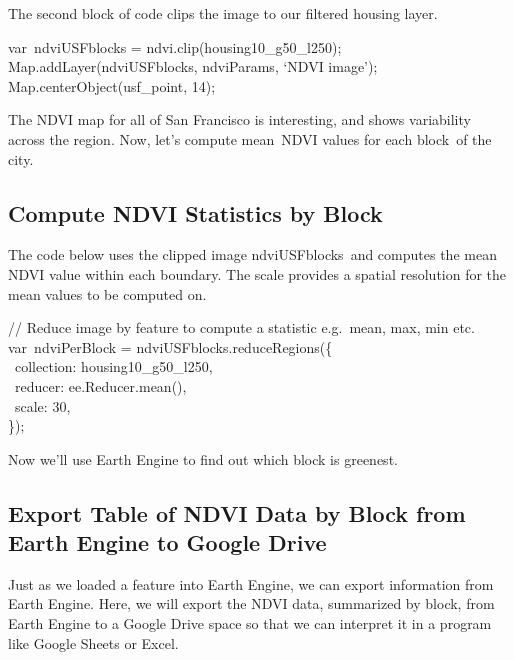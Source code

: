 \documentclass[
  letterpaper,
  DIV=11,
  numbers=noendperiod]{scrreprt}
\begin{document}
The second block of code clips the image to our filtered housing layer.

var~ndviUSFblocks = ndvi.clip(housing10\_g50\_l250);\\
Map.addLayer(ndviUSFblocks, ndviParams, `NDVI image');\\
Map.centerObject(usf\_point, 14);

The NDVI map for all of San Francisco is interesting, and shows
variability across the region. Now, let's compute mean~NDVI values for
each block~of the city.

\hypertarget{compute-ndvi-statistics-by-block}{%
\subsection{Compute NDVI Statistics by
Block}\label{compute-ndvi-statistics-by-block}}

The code below uses the clipped image ndviUSFblocks~and computes the
mean NDVI value within each boundary. The scale provides a spatial
resolution for the mean values to be computed on.

// Reduce image by feature to compute a statistic e.g.~mean, max, min
etc.\\
var~ndviPerBlock = ndviUSFblocks.reduceRegions(\{\\
\hspace*{0.333em} ~collection: housing10\_g50\_l250,\\
\hspace*{0.333em} ~reducer: ee.Reducer.mean(),\\
\hspace*{0.333em} ~scale: 30,\\
\});

Now we'll use Earth Engine to find out which block is greenest. ~

\hypertarget{export-table-of-ndvi-data-by-block-from-earth-engine-to-google-drive}{%
\subsection{Export Table of NDVI Data by Block from Earth Engine to
Google
Drive}\label{export-table-of-ndvi-data-by-block-from-earth-engine-to-google-drive}}

Just as we loaded a feature into Earth Engine, we can export information
from Earth Engine. Here, we will export the NDVI data, summarized by
block, from Earth Engine to a Google Drive space so that we can
interpret it in a program like Google Sheets or Excel.
\end{document}
